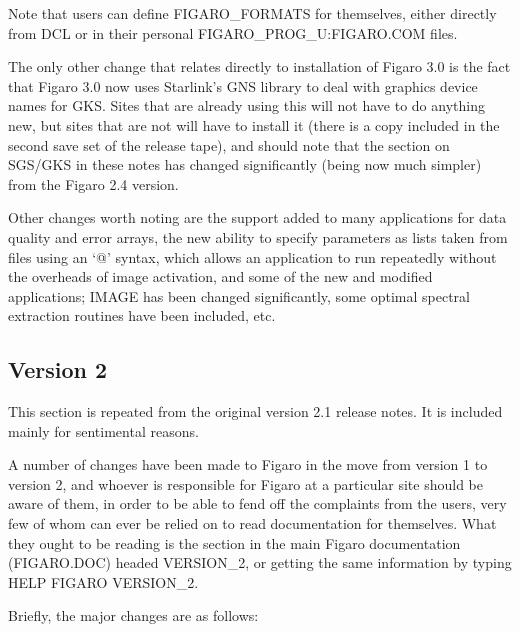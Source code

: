 Note that users can define FIGARO\_FORMATS for themselves, either directly from
DCL or in their personal FIGARO\_PROG\_U:FIGARO.COM files.

The only other change that relates directly to installation of Figaro 3.0 is
the fact that Figaro 3.0 now uses Starlink's GNS library to deal with graphics
device names for GKS. Sites that are already using this will not have to
do anything new, but sites that are not will have to install it (there is a
copy included in the second save set of the release tape), and should note
that the section on SGS/GKS in these notes has changed significantly (being now
much simpler) from the Figaro 2.4 version.

Other changes worth noting are the support added to many applications 
for data quality and error arrays, the new ability to specify parameters as
lists taken from files using an `@' syntax, which allows an application to
run repeatedly without the overheads of image activation, and some of the new
and modified applications; IMAGE has been changed significantly, some 
optimal spectral extraction routines have been included, etc.

\subsection{Version 2}

This section is repeated from the original version 2.1 release notes. It is
included mainly for sentimental reasons.

A number of changes have been made to Figaro in the move from version 1 to 
version 2, and whoever is responsible for Figaro at a particular site should be
aware of them, in order to be able to fend off the complaints from the users,
very few of whom can ever be relied on to read documentation for themselves.
What they ought to be reading is the section in the main Figaro documentation
(FIGARO.DOC) headed VERSION\_2, or getting the same information by typing HELP
FIGARO VERSION\_2.

Briefly, the major changes are as follows:

